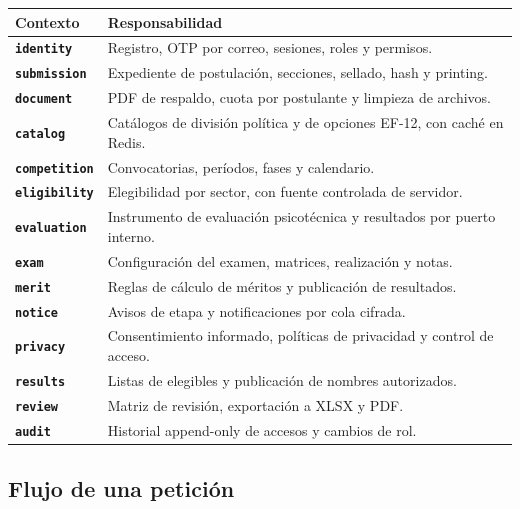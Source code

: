 \documentclass[11pt,a4paper]{article}
\newcommand{\code}[1]{\texttt{#1}}
\begin{document}
\begin{center}
\small
\begin{tabularx}{\textwidth}{@{}>{\bfseries\color{upseAzul}}l X@{}}
\toprule
Contexto & Responsabilidad \\
\midrule
\code{identity} & Registro, OTP por correo, sesiones, roles y permisos. \\
\code{submission} & Expediente de postulaci\'on, secciones, sellado, hash y printing. \\
\code{document} & PDF de respaldo, cuota por postulante y limpieza de archivos. \\
\code{catalog} & Cat\'alogos de divisi\'on pol\'itica y de opciones EF-12, con cach\'e en Redis. \\
\code{competition} & Convocatorias, per\'iodos, fases y calendario. \\
\code{eligibility} & Elegibilidad por sector, con fuente controlada de servidor. \\
\code{evaluation} & Instrumento de evaluaci\'on psicot\'ecnica y resultados por puerto interno. \\
\code{exam} & Configuraci\'on del examen, matrices, realizaci\'on y notas. \\
\code{merit} & Reglas de c\'alculo de m\'eritos y publicaci\'on de resultados. \\
\code{notice} & Avisos de etapa y notificaciones por cola cifrada. \\
\code{privacy} & Consentimiento informado, pol\'iticas de privacidad y control de acceso. \\
\code{results} & Listas de elegibles y publicaci\'on de nombres autorizados. \\
\code{review} & Matriz de revisi\'on, exportaci\'on a XLSX y PDF. \\
\code{audit} & Historial append-only de accesos y cambios de rol. \\
\bottomrule
\end{tabularx}
\end{center}

\subsection{Flujo de una petici\'on}
\end{document}
